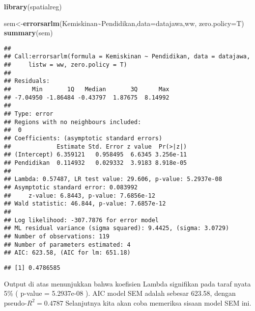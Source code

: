 \documentclass[
]{book}
\newenvironment{Shaded}{\begin{snugshade}}{\end{snugshade}}
\newcommand{\DataTypeTok}[1]{\textcolor[rgb]{0.13,0.29,0.53}{#1}}
\newcommand{\DecValTok}[1]{\textcolor[rgb]{0.00,0.00,0.81}{#1}}
\newcommand{\KeywordTok}[1]{\textcolor[rgb]{0.13,0.29,0.53}{\textbf{#1}}}
\newcommand{\NormalTok}[1]{#1}
\newcommand{\OperatorTok}[1]{\textcolor[rgb]{0.81,0.36,0.00}{\textbf{#1}}}
\begin{document}
\begin{Shaded}
\begin{Highlighting}[]
\KeywordTok{library}\NormalTok{(spatialreg)}

\NormalTok{sem\textless{}{-}}\KeywordTok{errorsarlm}\NormalTok{(Kemiskinan}\OperatorTok{\textasciitilde{}}\NormalTok{Pendidikan,}\DataTypeTok{data=}\NormalTok{datajawa,ww, }\DataTypeTok{zero.policy=}\NormalTok{T)}
\KeywordTok{summary}\NormalTok{(sem)}
\end{Highlighting}
\end{Shaded}

\begin{verbatim}
## 
## Call:errorsarlm(formula = Kemiskinan ~ Pendidikan, data = datajawa, 
##     listw = ww, zero.policy = T)
## 
## Residuals:
##      Min       1Q   Median       3Q      Max 
## -7.04950 -1.86484 -0.43797  1.87675  8.14992 
## 
## Type: error 
## Regions with no neighbours included:
##  0 
## Coefficients: (asymptotic standard errors) 
##             Estimate Std. Error z value  Pr(>|z|)
## (Intercept) 6.359121   0.958495  6.6345 3.256e-11
## Pendidikan  0.114932   0.029332  3.9183 8.918e-05
## 
## Lambda: 0.57487, LR test value: 29.606, p-value: 5.2937e-08
## Asymptotic standard error: 0.083992
##     z-value: 6.8443, p-value: 7.6856e-12
## Wald statistic: 46.844, p-value: 7.6857e-12
## 
## Log likelihood: -307.7876 for error model
## ML residual variance (sigma squared): 9.4425, (sigma: 3.0729)
## Number of observations: 119 
## Number of parameters estimated: 4 
## AIC: 623.58, (AIC for lm: 651.18)
\end{verbatim}

\begin{Shaded}
\end{Shaded}

\begin{verbatim}
## [1] 0.4786585
\end{verbatim}

Output di atas menunjukkan bahwa koefisien Lambda signifikan pada taraf nyata 5\% ( p-value = 5.2937e-08 ). AIC model SEM adalah sebesar 623.58, dengan pseudo-\(R^2=0.4787\) Selanjutnya kita akan coba memeriksa sisaan model SEM ini.
\end{document}
